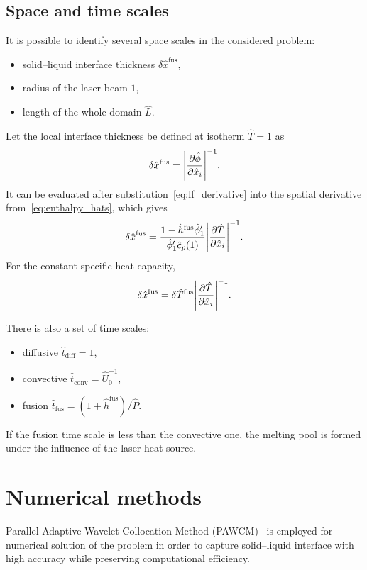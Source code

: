 \documentclass{article}
\newcommand{\fusion}[1]{{#1}^\mathrm{fus}}
\newcommand{\Hx}{\hat{x}}
\newcommand{\Ht}{\hat{t}}
\newcommand{\Hh}{\hat{h}}
\newcommand{\HT}{\hat{T}}
\newcommand{\HP}{\hat{P}}
\newcommand{\Hc}{\hat{c}}
\newcommand{\Hphi}{\hat{\phi}}
\newcommand{\HU}{\hat{U}}
\newcommand{\HL}{\hat{L}}
\begin{document}
\subsection{Space and time scales}

It is possible to identify several space scales in the considered problem:
\begin{itemize}
    \item solid--liquid interface thickness \(\delta\fusion{\Hx}\),
    \item radius of the laser beam \(1\),
    \item length of the whole domain \(\HL\).
\end{itemize}

Let the local interface thickness be defined at isotherm \(\HT=1\) as
\begin{equation}\label{eq:thickness_def}
    \delta\fusion{\Hx} = \qty|\pdv{\Hphi}{\Hx_i}|^{-1}.
\end{equation}
It can be evaluated after substitution~\eqref{eq:lf_derivative} into the spatial derivative from~\eqref{eq:enthalpy_hats}, which gives
\begin{equation}\label{eq:thickness_general}
    \fusion{\delta\Hx} = \frac{1-\fusion{\Hh}\Hphi'_1}{\Hphi'_1\Hc_p(1)}\qty|\pdv{\HT}{\Hx_i}|^{-1}.
\end{equation}
For the constant specific heat capacity,
\begin{equation}\label{eq:thickness_const}
    \fusion{\delta\Hx} = \delta\fusion{\HT}\qty|\pdv{\HT}{\Hx_i}|^{-1}.
\end{equation}

There is also a set of time scales:
\begin{itemize}
    \item diffusive \(\Ht_\mathrm{diff} = 1\),
    \item convective \(\Ht_\mathrm{conv} = \HU_0^{-1}\),
    \item fusion \(\Ht_\mathrm{fus} = (1+\fusion{\Hh})/\HP\).
\end{itemize}
If the fusion time scale is less than the convective one, the melting pool is formed under the influence of the laser heat source.

\section{Numerical methods}

Parallel Adaptive Wavelet Collocation Method (PAWCM)~\cite{Vasilyev2015} is employed for numerical solution of the problem
in order to capture solid--liquid interface with high accuracy while preserving computational efficiency.
\end{document}
